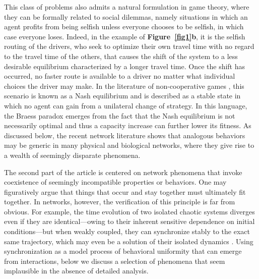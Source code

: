 \documentclass[
preprint,
superscriptaddress,
aps,
prl,
]{revtex4-1}
\begin{document}
This class of problems also admits a natural formulation in game theory, where 
they can be formally related to social dilemmas, namely situations in which an agent profits from being selfish unless everyone chooses to be selfish, in which case everyone loses.
Indeed, in the example of \textbf{Figure~\ref{fig1}b},
it is the selfish routing \cite{roughgarden2005selfish} of the drivers, who seek to optimize their own travel time with no regard to the travel time of the others, that causes the shift of the system to a less desirable equilibrium characterized by a longer travel time. Once the shift has occurred, no faster route is available to a driver  no matter what individual choices 
the driver
{\color{black} may}  
make. In the literature of non-cooperative games \cite{nash1950equilibrium}, this scenario is known as a Nash equilibrium and is described as a stable state in which no agent can gain from a unilateral change of strategy. 
In this language, the Braess paradox emerges from the fact that the Nash equilibrium is not necessarily optimal and thus  
a capacity increase can further lower its fitness.  As discussed below, the recent network literature shows that analogous behaviors may be generic in many physical and biological networks, where they give rise to a wealth of seemingly disparate phenomena.

The second part of the article is centered on network phenomena that invoke coexistence of seemingly incompatible properties or 
 {\color{black} behaviors.}
One may figuratively argue that things that occur and stay together must ultimately fit together.
In networks, however, the verification of this principle is far 
from obvious. 
For example, the time evolution of two isolated chaotic systems diverges even if they are identical---owing to their inherent sensitive dependence on initial conditions---but when weakly coupled, they can  synchronize stably to the exact same {\color{black} trajectory,}
 which may even be a solution of their isolated dynamics \cite{pecora1990synchronization}. Using synchronization as a model process 
  {\color{black} of}
  behavioral uniformity that can emerge from interactions, below we discuss a selection of phenomena that seem implausible in the absence of detailed analysis.
\end{document}
